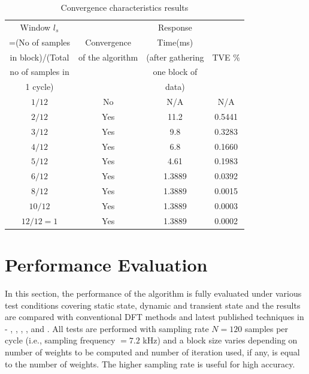 \documentclass{UCF_ETD}
\begin{document}
\begin{table}[H] 
\renewcommand{\arraystretch}{1.3}
\caption{Convergence characteristics results} \label{table:ConvergenceCharTable}
\centering
\begin{tabular}{c|c|c|c}
\hline
Window $l_s$ 		&				  & Response  		 & 		     \\
=(No of  samples    &  Convergence    & Time(ms)  		 &   		 \\
in block)/(Total    &of the algorithm & (after gathering & TVE $ \%$ \\
no of samples in	&				  &	one block of     &           \\
1 cycle) 			&				  & data)            &           \\
\hline\hline
$1/12$ 				& 		No 		  & 	N/A 		 & N/A 		 \\
\hline
$2/12$				& 	    Yes		  &  	11.2		 & 0.5441    \\
\hline
$3/12$				& 	    Yes		  &  	9.8	         & 0.3283    \\
\hline
$4/12$				& 	    Yes		  &  	6.8		     & 0.1660    \\    
\hline
$5/12$				& 	    Yes		  &  	4.61	     & 0.1983    \\
\hline
$6/12$				& 	    Yes		  &  	1.3889		 & 0.0392    \\
\hline
$8/12$				& 	    Yes		  &  	1.3889		 & 0.0015    \\
\hline
$10/12$				& 	    Yes		  &  	1.3889		 & 0.0003    \\
\hline
$12/12=1$			& 	    Yes		  &  	1.3889		 & 0.0002    \\
\hline
\end{tabular}
\end{table}

\section{Performance Evaluation} \label{PerfBLMS}
In this section, the performance of the algorithm is fully evaluated under various test conditions covering static state, dynamic and transient state and the results are compared with conventional DFT methods and latest published techniques in \cite{Benmouyal1989} - \cite{Sidhu1998}, \cite{Kusljevic2010}, \cite{Lopez2008}, \cite{Ren2011}, \cite{Kang2009} and \cite{Gou2003}. All tests are performed with sampling rate $N = 120$ samples per cycle (i.e., sampling frequency $=7.2$ kHz) and a block size varies depending on number of weights to be computed and number of iteration used, if any, is equal to the number of weights. The higher sampling rate is useful for high accuracy.
\end{document}
